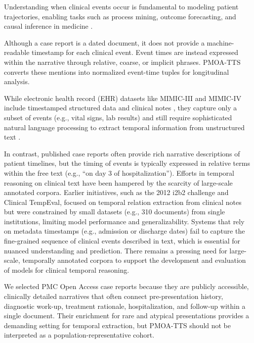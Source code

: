 \documentclass[pdflatex,sn-mathphys-num]{sn-jnl}%
\newif\ifshowrebuttalcolor
\newcommand{\rebuttal}[1]{%
  \ifshowrebuttalcolor
    \textcolor{rebuttalblue}{#1}%
  \else
    #1%
  \fi
}
\theoremstyle{thmstyleone}%
\theoremstyle{thmstyletwo}%
\theoremstyle{thmstylethree}%
\begin{document}
Understanding when clinical events occur is fundamental to modeling patient trajectories, enabling tasks such as process mining, outcome forecasting, and causal inference in medicine \citep{jensen2012mining, noren2010temporal, noroozizadeh2025forecasting}.
\rebuttal{
Although a case report is a dated document, it does not provide a machine-readable timestamp for each clinical event. Event times are instead expressed within the narrative through relative, coarse, or implicit phrases. PMOA-TTS converts these mentions into normalized event-time tuples for longitudinal analysis.
}
While electronic health record (EHR) datasets like MIMIC-III and MIMIC-IV include timestamped structured data and clinical notes \citep{johnson2016mimic, johnson2023mimic}, they capture only a subset of events (e.g., vital signs, lab results) and still require sophisticated natural language processing to extract temporal information from unstructured text \citep{viani2021temporal, cheng2023typed}.


In contrast, published case reports often provide rich narrative descriptions of patient timelines, but the timing of events is typically expressed in relative terms within the free text (e.g., “on day 3 of hospitalization”).
Efforts in temporal reasoning on clinical text have been hampered by the scarcity of large-scale annotated corpora.
Earlier initiatives, such as the 2012 i2b2 challenge and Clinical TempEval, focused on temporal relation extraction from clinical notes \citep{sun2013evaluating, bethard2016semeval, galvan2018investigating} but were constrained by small datasets (e.g., 310 documents) from single institutions, limiting model performance and generalizability.
Systems that rely on metadata timestamps (e.g., admission or discharge dates) fail to capture the fine-grained sequence of clinical events described in text, which is essential for nuanced understanding and prediction.
There remains a pressing need for large-scale, temporally annotated corpora to support the development and evaluation of models for clinical temporal reasoning.

\rebuttal{
We selected PMC Open Access case reports because they are publicly accessible, clinically detailed narratives that often connect pre-presentation history, diagnostic work-up, treatment rationale, hospitalization, and follow-up within a single document. Their enrichment for rare and atypical presentations provides a demanding setting for temporal extraction, but PMOA-TTS should not be interpreted as a population-representative cohort.
}
\end{document}
